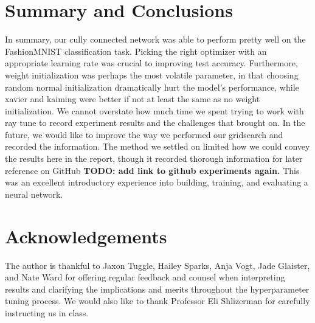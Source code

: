\documentclass[10pt]{amsart}
\begin{document}
\section{Summary and Conclusions}\label{sec:conclusions} 
In summary, our cully connected network was able to perform pretty well on the FashionMNIST classification task.
Picking the right optimizer with an appropriate learning rate was crucial to improving test accuracy.
Furthermore, weight initialization was perhaps the most volatile parameter, in that choosing random normal initialization dramatically hurt the model's performance, while xavier and kaiming were better if not at least the same as no weight initialization.
We cannot overstate how much time we spent trying to work with ray tune to record experiment results and the challenges that brought on.
In the future, we would like to improve the way we performed our gridsearch and recorded the information.
The method we settled on limited how we could convey the results here in the report, though it recorded thorough information for later reference on GitHub \textbf{TODO: add link to github experiments again.}
This was an excellent introductory experience into building, training, and evaluating a neural network.

\section*{Acknowledgements}
The author is thankful to Jaxon Tuggle, Hailey Sparks, Anja Vogt, Jade Glaister, and Nate Ward for offering regular feedback and counsel when interpreting results and clarifying the implications and merits throughout the hyperparameter tuning process.
We would also like to thank Professor Eli Shlizerman for carefully instructing us in class.


\end{document}
